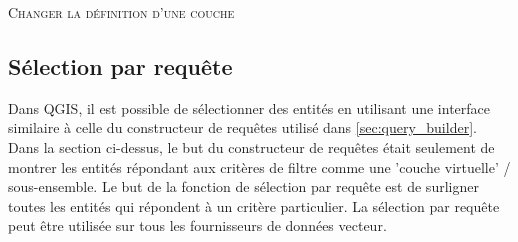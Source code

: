 \begin{itemize}
\begin{Astuce}\caption{\textsc{Changer la définition d'une couche}}
\end{Astuce}

\subsection{Sélection par requête}\label{sec:select_by_query}

Dans QGIS, il est possible de sélectionner des entités en utilisant une interface similaire à celle du constructeur de requêtes utilisé dans \ref{sec:query_builder}. Dans la section ci-dessus, le but du constructeur de requêtes était seulement de montrer les entités répondant aux critères de filtre comme une 'couche virtuelle' / sous-ensemble. Le but de la fonction de sélection par requête est de surligner toutes les entités qui répondent à un critère particulier. La sélection par requête peut être utilisée sur tous les fournisseurs de données vecteur.


\end{itemize}
